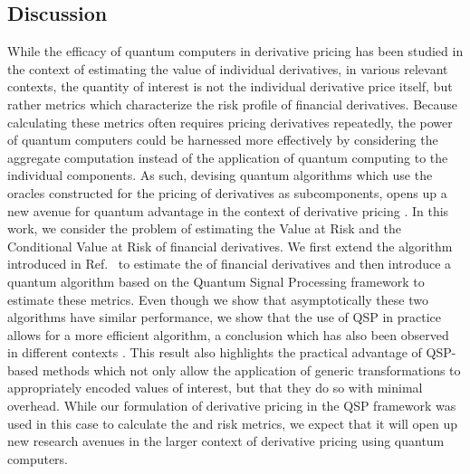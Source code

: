 \begin{enumerate}
\section{Discussion}
\label{sec:discussion}
While the efficacy of quantum computers in derivative pricing has been studied in the context of estimating the value of individual derivatives, in various relevant contexts, the quantity of interest is not the individual derivative price itself, but rather metrics which characterize the risk profile of financial derivatives.
Because calculating these metrics often requires pricing derivatives repeatedly, the power of quantum computers could be harnessed more effectively by considering the aggregate computation instead of the application of quantum computing to the individual components.
As such, devising quantum algorithms which use the oracles constructed for the pricing of derivatives as subcomponents, opens up a new avenue for quantum advantage in the context of derivative pricing \cite{Stamatopoulos_2022}.
In this work, we consider the problem of estimating the Value at Risk and the Conditional Value at Risk of financial derivatives.
We first extend the algorithm introduced in Ref.~\cite{Woerner_2019, egger2019credit} to estimate the \var{} of financial derivatives and then introduce a quantum algorithm based on the Quantum Signal Processing framework to estimate these metrics.
Even though we show that asymptotically these two algorithms have similar performance, we show that the use of QSP in practice allows for a more efficient algorithm, a conclusion which has also been observed in different contexts \cite{martyn2021efficient, Lin_2020, Rall_2023}.
This result also highlights the practical advantage of QSP-based methods which not only allow the application of generic transformations to appropriately encoded values of interest, but that they do so with minimal overhead.
While our formulation of derivative pricing in the QSP framework was used in this case to calculate the \var{} and \cvar{} risk metrics, we expect that it will open up new research avenues in the larger context of derivative pricing using quantum computers.


\end{enumerate}
